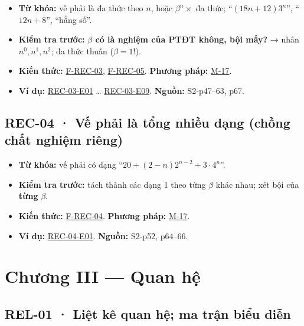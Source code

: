 \documentclass[
  10pt,
  twoside,openany]{book}
\providecommand{\tightlist}{%
  \setlength{\itemsep}{0pt}\setlength{\parskip}{0pt}}
\begin{document}
\begin{itemize}
\tightlist
\item
  \textbf{Từ khóa:} vế phải là đa thức theo \(n\), hoặc
  \(\beta^n\times\) đa thức; ``\((18n+12)3^n\)'', ``\(12n+8\)'', ``hằng
  số''.
\item
  \textbf{Kiểm tra trước:} \textbf{\(\beta\) có là nghiệm của PTĐT
  không, bội mấy?} → nhân \(n^0, n^1, n^2\); đa thức thuần
  (\(\beta=1\)!).
\item
  \textbf{Kiến thức:} \protect\hyperlink{F-REC-03}{F-REC-03},
  \protect\hyperlink{F-REC-05}{F-REC-05}. \textbf{Phương pháp:}
  \protect\hyperlink{M-17}{M-17}.
\item
  \textbf{Ví dụ:} \protect\hyperlink{REC-03-E01}{REC-03-E01} \ldots{}
  \protect\hyperlink{REC-03-E09}{REC-03-E09}. \textbf{Nguồn:}
  S2-p47--63, p67.
\end{itemize}

\hypertarget{REC-04}{%
\subsection{REC-04 · Vế phải là tổng nhiều dạng (chồng chất nghiệm
riêng)}\label{REC-04}}

\begin{itemize}
\tightlist
\item
  \textbf{Từ khóa:} vế phải có dạng ``\(20+(2-n)2^{n-2}+3\cdot4^n\)''.
\item
  \textbf{Kiểm tra trước:} tách thành các dạng 1 theo từng \(\beta\)
  khác nhau; xét bội của \textbf{từng} \(\beta\).
\item
  \textbf{Kiến thức:} \protect\hyperlink{F-REC-04}{F-REC-04}.
  \textbf{Phương pháp:} \protect\hyperlink{M-17}{M-17}.
\item
  \textbf{Ví dụ:} \protect\hyperlink{REC-04-E01}{REC-04-E01}.
  \textbf{Nguồn:} S2-p52, p64--66.
\end{itemize}

\hypertarget{chux1b0ux1a1ng-iii-quan-hux1ec7}{%
\section{Chương III --- Quan hệ}\label{chux1b0ux1a1ng-iii-quan-hux1ec7}}

\hypertarget{REL-01}{%
\subsection{REL-01 · Liệt kê quan hệ; ma trận biểu diễn}\label{REL-01}}
\end{document}
